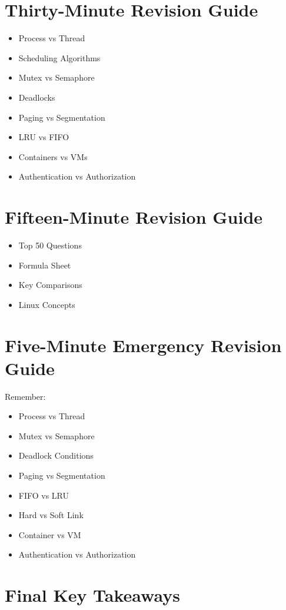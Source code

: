 \section{Thirty-Minute Revision Guide}

\begin{itemize}
\item Process vs Thread
\item Scheduling Algorithms
\item Mutex vs Semaphore
\item Deadlocks
\item Paging vs Segmentation
\item LRU vs FIFO
\item Containers vs VMs
\item Authentication vs Authorization
\end{itemize}

\section{Fifteen-Minute Revision Guide}

\begin{itemize}
\item Top 50 Questions
\item Formula Sheet
\item Key Comparisons
\item Linux Concepts
\end{itemize}

\section{Five-Minute Emergency Revision Guide}

Remember:

\begin{itemize}
\item Process vs Thread
\item Mutex vs Semaphore
\item Deadlock Conditions
\item Paging vs Segmentation
\item FIFO vs LRU
\item Hard vs Soft Link
\item Container vs VM
\item Authentication vs Authorization
\end{itemize}

\section{Final Key Takeaways}

